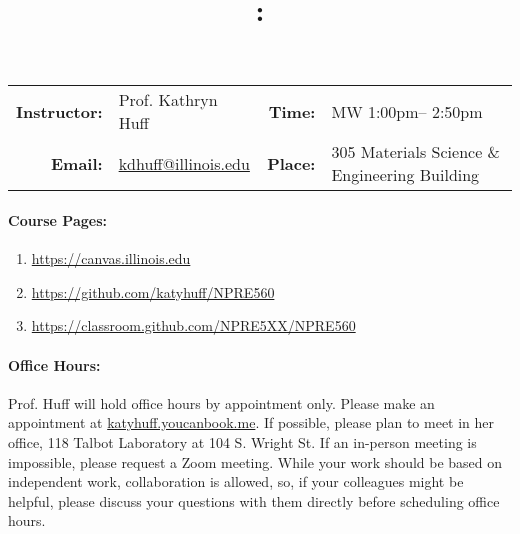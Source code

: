 \documentclass[11pt]{article}
\title{\CourseNumber: \CourseTitle\\}
\author{\CourseUniversity}
\date{\CourseSemester \CourseYear}
\makeatletter
\newcommand{\CourseNumber}{NPRE560}
\newcommand{\CourseDays}{MW\xspace}%
\newcommand{\CourseStart}{1:00pm\xspace}%
\newcommand{\CourseEnd}{2:50pm\xspace}%
\newcommand{\CourseInstructor}{Prof. Kathryn Huff}
\newcommand{\CourseInstructorEmail}{kdhuff@illinois.edu}
\newcommand{\CourseRoom}{305\xspace}%
\newcommand{\CourseBuilding}{Materials Science \& Engineering Building\xspace}%
\newcommand{\TeachingAssistant}{TA Name\xspace}%
\newcommand{\TAOfficeHourDays}{Wednesdays\xspace}%
\newcommand{\TAOfficeHourStart}{1:00pm\xspace}%
\newcommand{\TAOfficeHourEnd}{3:00pm\xspace}%
\newcommand{\TAOfficeHourPlace}{123 Talbot Laboratory\xspace}
\makeatother
\begin{document}
\maketitle
\renewcommand{\arraystretch}{2}
\begin{center}
\begin{table}[h]
\begin{tabularx}{\textwidth}{rXrX}
\hline
\textbf{Instructor:} & \CourseInstructor & \textbf{Time:} & \CourseDays \CourseStart -- \CourseEnd \\
\textbf{Email:} &  \href{mailto:\CourseInstructorEmail}{\CourseInstructorEmail} & \textbf{Place:} & \CourseRoom \CourseBuilding\\
\hline
\end{tabularx}

\end{table}
\end{center}

\paragraph{Course Pages:}
\begin{enumerate}
        \item \url{https://canvas.illinois.edu}
        \item \url{https://github.com/katyhuff/\CourseNumber}
        \item \url{https://classroom.github.com/NPRE5XX/\CourseNumber}
\end{enumerate}


\paragraph{Office Hours:} Prof. Huff will hold office hours by appointment 
only.  Please make an appointment at \url{katyhuff.youcanbook.me}.  
If possible, please plan to meet in her office, 118 Talbot Laboratory at 
104 S. Wright St. If an in-person meeting is impossible, please request a Zoom 
meeting. While your work should be based on independent work, collaboration is 
allowed, so, if your colleagues might be helpful, please discuss your questions 
with them directly before scheduling office hours.
\end{document}
